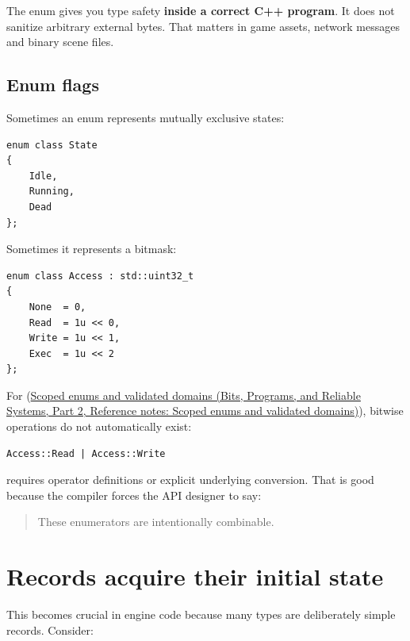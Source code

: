 The enum gives you type safety \textbf{inside a correct C++ program}. It does not sanitize arbitrary external bytes. That matters in game assets, network messages and binary scene files.

\subsection{Enum flags}\label{05-engine-i-ch003-enum-flags}

\hypertarget{05-engine-i-ch003-enum-flags}{}

Sometimes an enum represents mutually exclusive states:

\begin{verbatim}
enum class State
{
    Idle,
    Running,
    Dead
};
\end{verbatim}

Sometimes it represents a bitmask:

\begin{verbatim}
enum class Access : std::uint32_t
{
    None  = 0,
    Read  = 1u << 0,
    Write = 1u << 1,
    Exec  = 1u << 2
};
\end{verbatim}

For  (\href{../01-Bits-Programs-and-Reliable-Systems-P02/main.pdf\#appendix-23640fcee147}{Scoped enums and validated domains (Bits, Programs, and Reliable Systems, Part 2, Reference notes: Scoped enums and validated domains)}), bitwise operations do not automatically exist:

\begin{verbatim}
Access::Read | Access::Write
\end{verbatim}

requires operator definitions or explicit underlying conversion. That is good because the compiler forces the API designer to say:

\begin{quote}
These enumerators are intentionally combinable.
\end{quote}

\section{Records acquire their initial state}\label{05-engine-i-ch003-records-acquire-their-initial-state}

\hypertarget{05-engine-i-ch003-records-acquire-their-initial-state}{}

This becomes crucial in engine code because many types are deliberately simple records. Consider:

